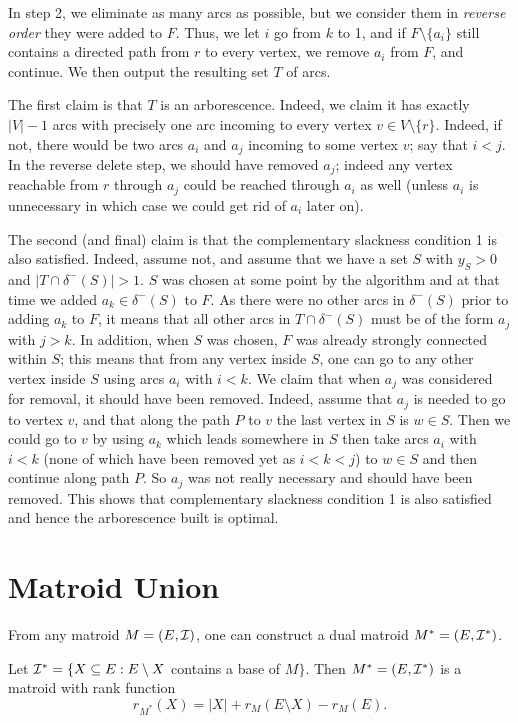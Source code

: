 \documentclass[12pt]{article}
\begin{document}
In step 2, we eliminate as many arcs as possible, but we consider them
in {\it reverse order} they were added to $F$. Thus, we let $i$ go
from $k$ to 1, and if $F\setminus\{a_i\}$ still contains a directed
path from $r$ to every vertex, we remove $a_i$ from $F$, and
continue. We then output the resulting set $T$ of arcs.

The first claim is that $T$ is an arborescence. Indeed, we claim it has
exactly $|V|-1$ arcs with precisely one arc incoming to every vertex
$v\in V\setminus\{r\}$. Indeed, if not, there would be two arcs $a_i$
and $a_j$ incoming to some vertex $v$; say that $i<j$. In the reverse
delete step, we should have removed  $a_j$; indeed any vertex
reachable from $r$ through $a_j$ could be reached through $a_i$ as
well (unless $a_i$ is unnecessary in which case we could get rid of
$a_i$ later on).

The second (and final) claim is that the complementary slackness
condition 1 is also satisfied. Indeed, assume not, and assume that we
have a set $S$ with $y_S>0$ and $|T \cap \delta^-(S)|>1$. $S$ was
chosen at some point by the algorithm and at that time we added
$a_k\in \delta^-(S)$ to $F$. As there were no other arcs in
$\delta^-(S)$ prior to adding $a_k$ to $F$, it means that all other arcs
in $T\cap \delta^-(S)$ must be of the form $a_j$ with $j>k$. In
addition, when $S$ was chosen, $F$ was already strongly connected
within $S$; this means that from any vertex inside $S$, one can go  to
any other vertex inside $S$ using arcs $a_i$ with $i<k$. We claim that
when $a_j$ was considered for removal, it should have been
removed. Indeed, assume that $a_j$ is needed to go to vertex $v$, and
that along the path $P$ to $v$ the last vertex in $S$ is $w\in S$. Then we
could go to $v$ by using $a_k$ which leads somewhere in $S$ then take
arcs $a_i$ with $i<k$ (none of which have been removed yet as $i<k<j$)
to $w\in S$ and then continue along path $P$. So $a_j$ was not really
necessary and should have been removed. This shows that complementary
slackness condition 1 is also satisfied and hence the arborescence
built is optimal. 

\section{Matroid Union} \label{matroidunion}

From any matroid $M=(E,{\cal I})$, one can construct a dual matroid
$M^*=(E, {\cal I}^*)$.  

\begin{theorem} \label{dual}
Let ${\cal I}^*=\{X \subseteq E: E\setminus X$ contains a
base of $M\}$. Then $M^*=(E,{\cal I}^*)$ is a matroid with rank
function
$$ r_{M^*}(X)=|X|+r_M(E\setminus X)-r_M(E).$$
\end{theorem}
\end{document}
